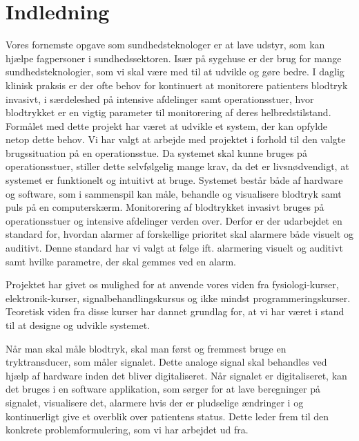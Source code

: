 \chapter{Indledning}
Vores fornemste opgave som sundhedsteknologer er at lave udstyr, som kan hjælpe fagpersoner i sundhedssektoren. Især på sygehuse er der brug for mange sundhedsteknologier, som vi skal være med til at udvikle og gøre bedre. I daglig klinisk praksis er der ofte behov for kontinuert at monitorere patienters blodtryk invasivt, i særdeleshed på intensive afdelinger samt operationsstuer, hvor blodtrykket er en vigtig parameter til monitorering af deres helbredstilstand. Formålet med dette projekt har været at udvikle et system, der kan opfylde netop dette behov. Vi har valgt at arbejde med projektet i forhold til den valgte brugssituation på en operationsstue. Da systemet skal kunne bruges på operationsstuer, stiller dette selvfølgelig mange krav, da det er livsnødvendigt, at systemet er funktionelt og intuitivt at bruge. Systemet består både af hardware og software, som i sammenspil kan måle, behandle og visualisere blodtryk samt puls på en computerskærm. Monitorering af blodtrykket invasivt bruges på operationsstuer og intensive afdelinger verden over. Derfor er der udarbejdet en standard for, hvordan alarmer af forskellige prioritet skal alarmere både visuelt og auditivt. Denne standard har vi valgt at følge ift. alarmering visuelt og auditivt samt hvilke parametre, der skal gemmes ved en alarm.

Projektet har givet os mulighed for at anvende vores viden fra fysiologi-kurser, elektronik-kurser, signalbehandlingskursus og ikke mindst programmeringskurser. Teoretisk viden fra disse kurser har dannet grundlag for, at vi har været i stand til at designe og udvikle systemet.
 
Når man skal måle blodtryk, skal man først og fremmest bruge en tryktransducer, som måler signalet. Dette analoge signal skal behandles ved hjælp af hardware inden det bliver digitaliseret. Når signalet er digitaliseret, kan det bruges i en software applikation, som sørger for at lave beregninger på signalet, visualisere det, alarmere hvis der er pludselige ændringer i og kontinuerligt give et overblik over patientens status. Dette leder frem til den konkrete problemformulering, som vi har arbejdet ud fra. 



